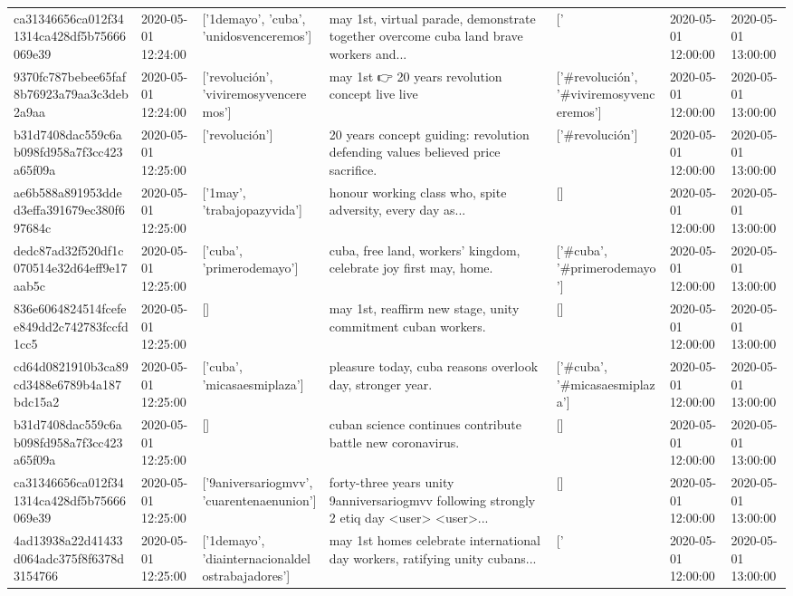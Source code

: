 \begin{tabular}{lllllll}
ca31346656ca012f341314ca428df5b75666069e39 & 2020-05-01 12:24:00 & ['1demayo', 'cuba', 'unidosvenceremos'] & may 1st, virtual parade, demonstrate together overcome cuba land brave workers and... & ['#1demayo', '#cuba', '#unidosvenceremos'] & 2020-05-01 12:00:00 & 2020-05-01 13:00:00 \\
9370fc787bebee65faf8b76923a79aa3c3deb2a9aa & 2020-05-01 12:24:00 & ['revolución', 'viviremosyvenceremos'] & may 1st 👉 20 years revolution concept live live & ['#revolución', '#viviremosyvenceremos'] & 2020-05-01 12:00:00 & 2020-05-01 13:00:00 \\
b31d7408dac559c6ab098fd958a7f3cc423a65f09a & 2020-05-01 12:25:00 & ['revolución'] & 20 years concept guiding: revolution defending values believed price sacrifice. & ['#revolución'] & 2020-05-01 12:00:00 & 2020-05-01 13:00:00 \\
ae6b588a891953dded3effa391679ec380f697684c & 2020-05-01 12:25:00 & ['1may', 'trabajopazyvida'] & honour working class who, spite adversity, every day as... & [] & 2020-05-01 12:00:00 & 2020-05-01 13:00:00 \\
dedc87ad32f520df1c070514e32d64eff9e17aab5c & 2020-05-01 12:25:00 & ['cuba', 'primerodemayo'] & cuba, free land, workers' kingdom, celebrate joy first may, home. & ['#cuba', '#primerodemayo'] & 2020-05-01 12:00:00 & 2020-05-01 13:00:00 \\
836e6064824514fcefee849dd2c742783fccfd1cc5 & 2020-05-01 12:25:00 & [] & may 1st, reaffirm new stage, unity commitment cuban workers. & [] & 2020-05-01 12:00:00 & 2020-05-01 13:00:00 \\
cd64d0821910b3ca89cd3488e6789b4a187bdc15a2 & 2020-05-01 12:25:00 & ['cuba', 'micasaesmiplaza'] & pleasure today, cuba reasons overlook day, stronger year. & ['#cuba', '#micasaesmiplaza'] & 2020-05-01 12:00:00 & 2020-05-01 13:00:00 \\
b31d7408dac559c6ab098fd958a7f3cc423a65f09a & 2020-05-01 12:25:00 & [] & cuban science continues contribute battle new coronavirus. & [] & 2020-05-01 12:00:00 & 2020-05-01 13:00:00 \\
ca31346656ca012f341314ca428df5b75666069e39 & 2020-05-01 12:25:00 & ['9aniversariogmvv', 'cuarentenaenunion'] & forty-three years unity 9anniversariogmvv following strongly 2 etiq day <user> <user>... & [] & 2020-05-01 12:00:00 & 2020-05-01 13:00:00 \\
4ad13938a22d41433d064adc375f8f6378d3154766 & 2020-05-01 12:25:00 & ['1demayo', 'diainternacionaldelostrabajadores'] & may 1st homes celebrate international day workers, ratifying unity cubans... & ['#1demayo', '#diainternacionaldelostrabajadores'] & 2020-05-01 12:00:00 & 2020-05-01 13:00:00 \\

\end{tabular}

